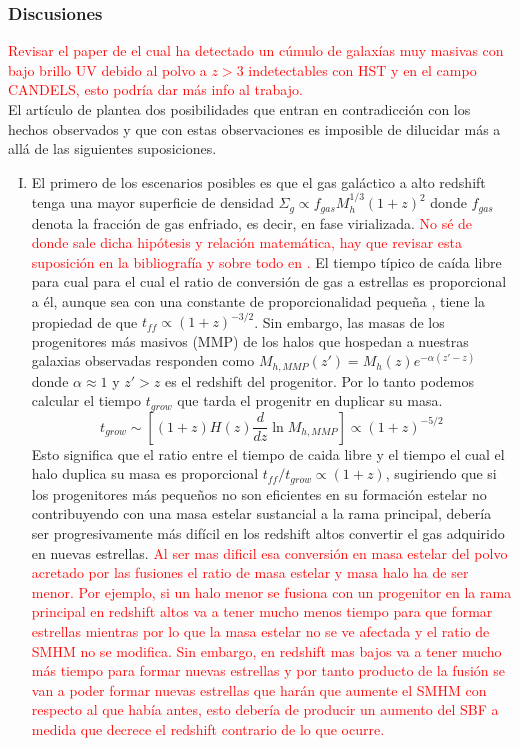 \subsubsection*{Discusiones}
\textcolor{red}{Revisar el paper de \cite{wang2019dominant} el cual ha detectado un cúmulo de galaxías muy masivas con bajo brillo UV debido al polvo a $z>3$ indetectables con HST y en el campo CANDELS, esto podría dar más info al trabajo.}\\

El artículo de \cite{finkelstein2015increasing} plantea dos posibilidades que entran en contradicción con los hechos observados y que con estas observaciones es imposible de dilucidar más a allá de las siguientes suposiciones.

\begin{enumerate}[I) ]
\item El primero de los escenarios posibles es que el gas galáctico a alto redshift tenga una mayor superficie de densidad $\Sigma_g \propto f_{gas}M_h^{1/3}(1+z)^2$ donde $f_{gas}$ denota la fracción de gas enfriado, es decir, en fase virializada. \textcolor{red}{No sé de donde sale dicha hipótesis y relación matemática, hay que revisar esta suposición en la bibliografía y sobre todo en \cite{krumholz2011universal}.} El tiempo típico de caída libre para cual para el cual el ratio de conversión de gas a estrellas es proporcional a él, aunque sea con una constante de proporcionalidad pequeña \citep{krumholz2011universal}, tiene la propiedad de que $t_{ff}\propto (1+z)^{-3/2}$. Sin embargo, las masas de los progenitores más masivos (MMP) de los halos que hospedan a nuestras galaxias observadas responden como $M_{h,MMP}(z')=M_h(z)e^{-\alpha(z'-z)}$ donde $\alpha \approx 1$ y $z'>z$ es el redshift del progenitor. Por lo tanto podemos calcular el tiempo $t_{grow}$ que tarda el progenitr en duplicar su masa.
$$t_{grow}\sim \left[(1+z)H(z)\frac{d}{dz}\ln M_{h,MMP}\right]\propto (1+z)^{-5/2}$$
Esto significa que el ratio entre el tiempo de caida libre y el tiempo el cual el halo duplica su masa es proporcional $t_{ff}/t_{grow}\propto (1+z)$, sugiriendo que si los progenitores más pequeños no son eficientes en su formación estelar no contribuyendo con una masa estelar sustancial a la rama principal, debería ser progresivamente más difícil en los redshift altos convertir el gas adquirido en nuevas estrellas. \textcolor{red}{Al ser mas dificil esa conversión en masa estelar del polvo acretado por las fusiones el ratio de masa estelar y masa halo ha de ser menor. Por ejemplo, si un halo menor se fusiona con un progenitor en la rama principal en redshift altos va a tener mucho menos tiempo para que formar estrellas mientras por lo que la masa estelar no se ve afectada y el ratio de SMHM no se modifica. Sin embargo, en redshift mas bajos va a tener mucho más tiempo para formar nuevas estrellas y por tanto producto de la fusión se van a poder formar nuevas estrellas que harán que aumente el SMHM con respecto al que había antes, esto debería de producir un aumento del SBF a medida que decrece el redshift contrario de lo que ocurre.}


\end{enumerate}
